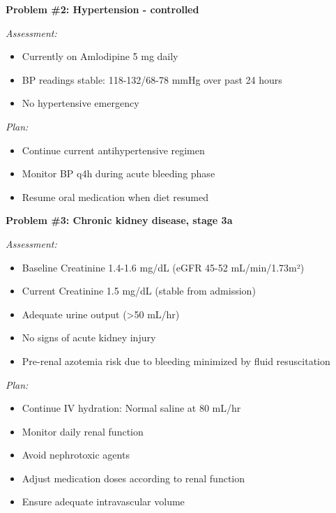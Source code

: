 \documentclass[12pt,a4paper]{article}
\begin{document}
\begin{mdframed}[linecolor=emergency_gray,linewidth=1pt]
\vspace{0.5cm}

\textbf{Problem \#2: Hypertension - controlled}

\textit{Assessment:}
\begin{itemize}[nosep,leftmargin=15pt]
\item Currently on Amlodipine 5 mg daily
\item BP readings stable: 118-132/68-78 mmHg over past 24 hours
\item No hypertensive emergency
\end{itemize}

\textit{Plan:}
\begin{itemize}[nosep,leftmargin=15pt]
\item Continue current antihypertensive regimen
\item Monitor BP q4h during acute bleeding phase
\item Resume oral medication when diet resumed
\end{itemize}

\vspace{0.5cm}

\textbf{Problem \#3: Chronic kidney disease, stage 3a}

\textit{Assessment:}
\begin{itemize}[nosep,leftmargin=15pt]
\item Baseline Creatinine 1.4-1.6 mg/dL (eGFR 45-52 mL/min/1.73m²)
\item Current Creatinine 1.5 mg/dL (stable from admission)
\item Adequate urine output (>50 mL/hr)
\item No signs of acute kidney injury
\item Pre-renal azotemia risk due to bleeding minimized by fluid resuscitation
\end{itemize}

\textit{Plan:}
\begin{itemize}[nosep,leftmargin=15pt]
\item Continue IV hydration: Normal saline at 80 mL/hr
\item Monitor daily renal function
\item Avoid nephrotoxic agents
\item Adjust medication doses according to renal function
\item Ensure adequate intravascular volume
\end{itemize}

\vspace{0.5cm}


\end{mdframed}
\end{document}
